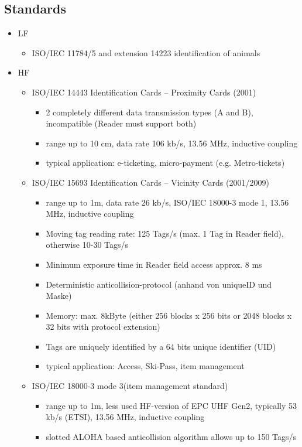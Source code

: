 \subsection{Standards}
	\begin{itemize}
		\item LF
			\begin{itemize}
				\item ISO/IEC 11784/5 and extension 14223 identification of animals
			\end{itemize} 
		\item HF
			\begin{itemize}
				\item ISO/IEC 14443	Identification Cards – Proximity Cards (2001) 
					\begin{itemize}
						\item 2 completely different data transmission types (A and B), incompatible (Reader must support both)
						\item range up to 10 cm, data rate 106 kb/s, 13.56 MHz, inductive coupling
						\item typical application: e-ticketing, micro-payment (e.g. Metro-tickets)
					\end{itemize}
				\item ISO/IEC 15693	Identification Cards – Vicinity Cards (2001/2009)
					\begin{itemize}
						\item range up to 1m, data rate 26 kb/s, ISO/IEC 18000-3 mode 1, 13.56 MHz, inductive coupling
						\item Moving tag reading rate: 125 Tags/s (max. 1 Tag in Reader field), otherwise 10-30 Tags/s
						\item Minimum exposure time in Reader field access approx. 8 ms
						\item Deterministic anticollision-protocol (anhand von uniqueID und Maske)
						\item Memory: max. 8kByte (either 256 blocks x 256 bits or 2048 blocks x 32 bits with protocol extension)
						\item Tags are uniquely identified by a 64 bits unique identifier (UID)
						\item typical application: Access, Ski-Pass, item management
					\end{itemize}
				\item ISO/IEC 18000-3 mode 3(item management standard)
					\begin{itemize}
						\item range up to 1m, less used HF-version of EPC UHF Gen2, typically 53 kb/s (ETSI), 13.56 MHz, inductive coupling
						\item slotted ALOHA based anticollision algorithm allows up to 150 Tags/s
					\end{itemize}
						

\end{itemize}
\end{itemize}
